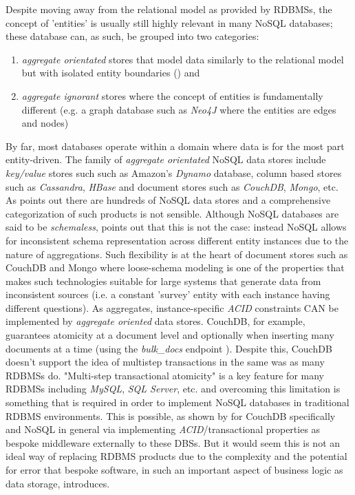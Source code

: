 Despite moving away from the relational model as provided by RDBMSs, the concept of 'entities' is usually still highly relevant in many NoSQL databases; these database can, as such, be grouped into two categories:

\begin{enumerate}
    \item \textit{aggregate orientated} stores that model data similarly to the relational model but with isolated entity boundaries (\cite{fowlerAggregate}) and
    \item \textit{aggregate ignorant} stores where the concept of entities is fundamentally different (e.g. a graph database such as \textit{Neo4J} where the entities are edges and nodes)
\end{enumerate}

By far, most databases operate within a domain where data is for the most part entity-driven. The family of \textit{aggregate orientated} NoSQL data stores include \textit{key/value} stores such such as Amazon's \textit{Dynamo} database, column based stores such as \textit{Cassandra}, \textit{HBase} and document stores such as \textit{CouchDB}, \textit{Mongo}, etc. As \cite{GANESHCHANDRA201513} points out there are hundreds of NoSQL data stores and a comprehensive categorization of such products is not sensible. Although NoSQL databases are said to be \textit{schemaless}, \cite{ATZENI2016} points out that this is not the case: instead NoSQL allows for inconsistent schema representation across different entity instances due to the nature of aggregations. Such flexibility is at the heart of document stores such as CouchDB and Mongo where loose-schema modeling is one of the properties that makes such technologies suitable for large systems that generate data from inconsistent sources (i.e. a constant 'survey' entity with each instance having different questions). As aggregates, instance-specific \textit{ACID} constraints CAN be implemented by \textit{aggregate oriented} data stores. CouchDB, for example, guarantees atomicity at a document level and optionally when inserting many documents at a time (using the \textit{bulk\_docs} endpoint \cite{bulkDocs}). Despite this, CouchDB doesn't support the idea of multistep transactions in the same was as many RDBMSs do. "Multi-step transactional atomicity" is a key feature for many RDBMSs including \textit{MySQL}, \textit{SQL Server}, etc. and overcoming this limitation is something that is required in order to implement NoSQL databases in traditional RDBMS environments. This is possible, as shown by \cite{Rashmi2017} for CouchDB specifically and NoSQL in general \cite{LOTFY2016133} via implementing \textit{ACID}/transactional properties as bespoke middleware externally to these DBSs. But it would seem this is not an ideal way of replacing RDBMS products due to the complexity and the potential for error that bespoke software, in such an important aspect of business logic as data storage, introduces.

